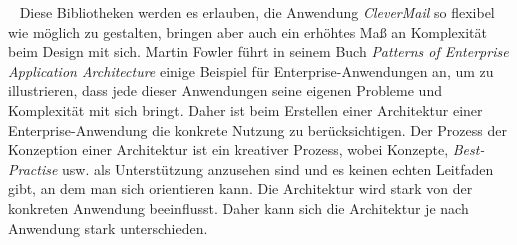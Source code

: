 \ \newline
Diese Bibliotheken werden es erlauben, die Anwendung \emph{CleverMail} so flexibel wie möglich zu gestalten, bringen aber auch ein erhöhtes Maß an Komplexität beim Design mit sich. 
\newline
\newline
Martin Fowler führt in seinem Buch \emph{Patterns of Enterprise Application Architecture}\cite[5-6]{patternsOfEnterprise} einige Beispiel für Enterprise-Anwendungen an, um zu illustrieren, dass jede dieser Anwendungen seine eigenen Probleme und Komplexität mit sich bringt. Daher ist beim Erstellen einer Architektur einer Enterprise-Anwendung die konkrete Nutzung zu berücksichtigen. Der Prozess der Konzeption einer Architektur ist ein kreativer Prozess, wobei Konzepte, \emph{Best-Practise} usw. als Unterstützung anzusehen sind und es keinen echten Leitfaden gibt, an dem man sich orientieren kann. Die Architektur wird stark von der konkreten Anwendung beeinflusst. Daher kann sich die Architektur je nach Anwendung stark unterschieden.

